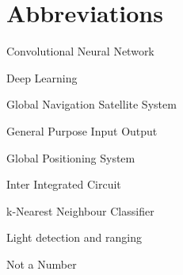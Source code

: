 \chapter*{Abbreviations}

\begin{description}
\setlength{\itemsep}{-11pt}
\setlength{\leftmargin}{900pt}

\item[CNN] Convolutional Neural Network

\item[DL] Deep Learning

\item[GNNS] Global Navigation Satellite System
\item[GPIO] General Purpose Input Output
\item[GPS] Global Positioning System

\item[I2C] Inter Integrated Circuit

\item[kNN] k-Nearest Neighbour Classifier

\item[LIDAR] Light detection and ranging

\item[NaN] Not a Number

\end{description}
